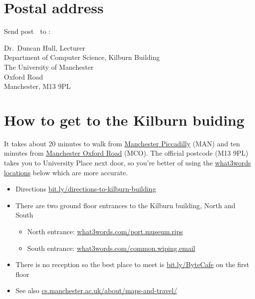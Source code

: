 \documentclass[12pt,]{book}
\providecommand{\tightlist}{%
  \setlength{\itemsep}{0pt}\setlength{\parskip}{0pt}}
\begin{document}
\hypertarget{postal-address}{%
\section{Postal address}\label{postal-address}}

Send post 🐌 to :

Dr.~Duncan Hull, Lecturer\\
Department of Computer Science, Kilburn Building\\
The University of Manchester\\
Oxford Road\\
Manchester, M13 9PL

\hypertarget{how-to-get-to-the-kilburn-buiding}{%
\section{How to get to the Kilburn buiding}\label{how-to-get-to-the-kilburn-buiding}}

It takes about 20 minutes to walk from \href{https://www.nationalrail.co.uk/stations_destinations/man.aspx}{Manchester Piccadilly} (MAN) and ten minutes from \href{https://www.nationalrail.co.uk/stations/mco/details.aspx}{Manchester Oxford Road} (MCO). The official postcode (M13 9PL) takes you to University Place next door, so you're better of using the \href{https://www.bbc.co.uk/news/uk-england-49319760}{what3words locations} below which are more accurate.

\begin{itemize}
\tightlist
\item
  Directions \href{http://bit.ly/directions-to-kilburn-building}{bit.ly/directions-to-kilburn-building}
\item
  There are two ground floor entrances to the Kilburn building, North and South

  \begin{itemize}
  \tightlist
  \item
    North entrance: \href{https://what3words.com/port.museum.rips}{what3words.com/port.museum.rips}
  \item
    South entrance: \href{https://what3words.com/common.wiping.email}{what3words.com/common.wiping.email}
  \end{itemize}
\item
  There is no reception so the best place to meet is \href{http://bit.ly/ByteCafe}{bit.ly/ByteCafe} on the first floor
\item
  See also \href{https://www.cs.manchester.ac.uk/about/maps-and-travel/}{cs.manchester.ac.uk/about/maps-and-travel/}
\end{itemize}
\end{document}
